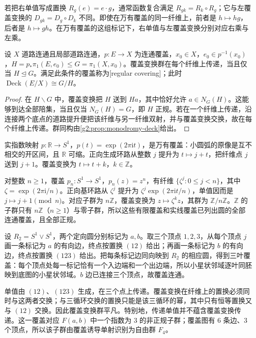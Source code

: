 若把右单值写成置换 \(R_g(e)=e\cdot g\)，通常函数复合满足 \(R_{gk}=R_k\circ R_g\)；它与左覆盖变换的 \(D_{gk}=D_g\circ D_k\) 不同。即使在万有覆盖的同一纤维上，前者是 \(h\mapsto hg\)，后者是 \(h\mapsto gh\)。在万有覆盖的这组标记下，右单值与左覆盖变换分别对应右乘与左乘。

\begin{corollary}\label{g2:cor:regular-covering}
	设 \(X\) 道路连通且局部道路连通，\(p:E\rightarrow X\) 为连通覆盖，\(x_0\in X\)，\(e_0\in p^{-1}(x_0)\)，\(H=p_*\pi_1(E,e_0)\leq G=\pi_1(X,x_0)\)。覆盖变换群在每个纤维上传递，当且仅当 \(H\trianglelefteq G\)。满足此条件的覆盖称为[regular covering]；此时 \(\operatorname{Deck}(E/X)\cong G/H\)。
\end{corollary}
\begin{proof}
	在 \(H\backslash G\) 中，覆盖变换把 \(H\) 送到 \(Ha\)，其中恰好允许 \(a\in N_G(H)\)。这能够到达全部陪集，当且仅当 \(N_G(H)=G\)，即 \(H\) 正规。若在一个纤维上传递，沿连接两个底点的道路提升便把该纤维与另一纤维双射，并与覆盖变换交换，故在每个纤维上传递。群同构由\cref{g2:prop:monodromy-deck}给出。
\end{proof}

\begin{example}\label{g2:exm:circle-coverings}
	实指数映射 \(p:\mathbb R\rightarrow S^1\)，\(p(t)=\exp(2\pi\mathrm{i}t)\)，是万有覆盖：小圆弧的原像是互不相交的开区间，且 \(\mathbb R\) 可缩。正向生成环路从整数 \(j\) 提升为 \(t\mapsto j+t\)，把纤维点 \(j\) 送到 \(j+1\)。覆盖变换为 \(t\mapsto t+k\)，\(k\in\mathbb Z\)。

	对整数 \(n\geq1\)，覆盖 \(p_n:S^1\rightarrow S^1\)，\(p_n(z)=z^n\)，有纤维 \(\{\zeta^j:0\leq j<n\}\)，其中 \(\zeta=\exp(2\pi\mathrm{i}/n)\)。正向基环路从 \(\zeta^j\) 提升为 \(\zeta^j\exp(2\pi\mathrm{i}t/n)\)，单值因而是 \(j\mapsto j+1\pmod n\)。对应子群为 \(n\mathbb Z\)，覆盖变换为 \(z\mapsto\zeta^kz\)，其群为 \(\mathbb Z/n\mathbb Z\)。\(\mathbb Z\) 的子群只有 \(n\mathbb Z\)（\(n\geq1\)）与零子群，所以这些有限覆盖和实线覆盖已列出圆的全部连通覆盖，且全部正规。
\end{example}

\begin{example}\label{g2:exm:nonregular-three-cover}
	设 \(R_2=S^1\vee S^1\)，两个定向圆分别标记为 \(a,b\)。取三个顶点 \(1,2,3\)，从每个顶点 \(j\) 画一条标记为 \(a\) 的有向边，终点按置换 \((12)\) 给出；再画一条标记为 \(b\) 的有向边，终点按置换 \((123)\) 给出。把每条标记边同向映到 \(R_2\) 的相应圆，得到三叶覆盖：每个顶点处每一标记恰有一个入边端和一个出边端，所以小星状邻域逐叶同胚映到底图的小星状邻域。\(b\) 边已连接三个顶点，故覆盖连通。

	单值由 \((12)\)、\((123)\) 生成，在三个点上传递。覆盖变换在纤维上的置换必须同时与这两者交换；与三循环交换的置换只能是该三循环的幂，其中只有恒等置换又与 \((12)\) 交换。因此覆盖变换群平凡。特别地，传递单值并不蕴含覆盖变换传递。这一覆盖对应 \(F(a,b)\) 中一个指数为 \(3\) 的非正规子群；覆盖图有 \(6\) 条边、\(3\) 个顶点，所以该子群由覆盖诱导单射识别为自由群 \(F_4\)。
\end{example}
